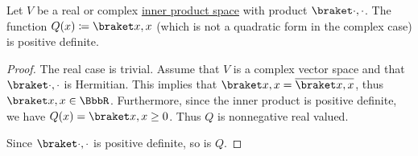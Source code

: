 \begin{lemma}\label{thm:inner_product_quadratic_form_is_positive_definite}
  Let \( V \) be a real or complex \hyperref[def:inner_product_space]{inner product space} with product \( \inner \cdot \cdot \). The function \( Q(x) \coloneqq \inner x x \) (which is not a quadratic form in the complex case) is positive definite.
\end{lemma}
\begin{proof}
  The real case is trivial. Assume that \( V \) is a complex vector space and that \( \inner \cdot \cdot \) is Hermitian. This implies that \( \inner x x = \overline{\inner x x} \), thus \( \inner x x \in \BbbR \). Furthermore, since the inner product is positive definite, we have \( Q(x) = \inner x x \geq 0 \). Thus \( Q \) is nonnegative real valued.

  Since \( \inner \cdot \cdot \) is positive definite, so is \( Q \).
\end{proof}

